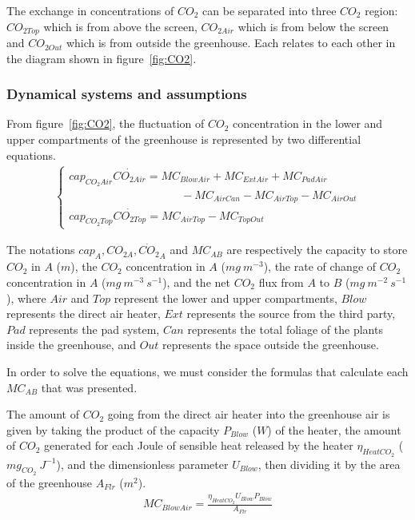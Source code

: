 \documentclass[a4paper]{article}
\numberwithin{equation}{section}
\begin{document}
The exchange in concentrations of \(CO_2\) can be separated into three \(CO_2\) region: \(CO_{2Top}\) which is from above the screen, \(CO_{2Air}\) which is from below the screen and \(CO_{2Out}\) which is from outside the greenhouse.
Each relates to each other in the diagram shown in figure~\ref{fig:CO2}.

\subsubsection{Dynamical systems and assumptions}
From figure~\ref{fig:CO2}, the fluctuation of \(CO_2\) concentration in the lower and upper compartments of the greenhouse is represented by two differential equations.
\begin{align}
  \begin{cases}
    cap_{CO_2Air}\dot{CO_{2Air}} = MC_{BlowAir} + MC_{ExtAir} + MC_{PadAir} \\ \qquad \qquad \qquad \qquad \qquad
    - MC_{AirCan} - MC_{AirTop} - MC_{AirOut}                               \\
    cap_{CO_2Top}\dot{CO_{2Top}} = MC_{AirTop} - MC_{TopOut}
  \end{cases}
\end{align}

The notations \(cap_A, CO_{2 A}, \dot{CO_2}_A\) and \(MC_{AB}\) are respectively the capacity to store \(CO_2\) in \(A\) (\(m\)), the \(CO_2\) concentration in \(A\) (\(mg\ m^{-3}\)), the rate of change of \(CO_2\) concentration in \(A\) (\(mg\ m^{-3}\ s^{-1}\)), and the net \(CO_2\) flux from \(A\) to \(B\) (\(mg\ m^{-2}\ s^{-1}\)), where \(Air\) and \(Top\) represent the lower and upper compartments, \(Blow\) represents the direct air heater, \(Ext\) represents the source from the third party, \(Pad\) represents the pad system, \(Can\) represents the total foliage of the plants inside the greenhouse, and \(Out\) represents the space outside the greenhouse.

In order to solve the equations, we must consider the formulas that calculate each \(MC_{AB}\) that was presented.

The amount of \(CO_2\) going from the direct air heater into the greenhouse air is given by taking the product of the capacity \(P_{Blow}\) (\(W\)) of the heater, the amount of \(CO_2\) generated for each Joule of sensible heat released by the heater \(\eta_{HeatCO_2}\) (\(mg_{CO_2}\ J^{-1}\)), and the dimensionless parameter \(U_{Blow}\), then dividing it by the area of the greenhouse \(A_{Flr}\) (\(m^2\)).
\begin{align}
  MC_{BlowAir} = \frac{\eta_{HeatCO_2}U_{Blow}P_{Blow}}{A_{Flr}}
\end{align}
\end{document}
